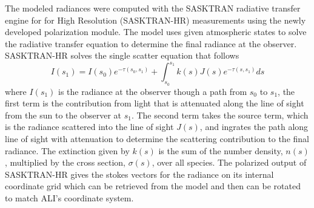 \documentclass[12pt]{article}
\begin{document}
The modeled radiances were computed with the SASKTRAN radiative transfer engine \citep{Bourassa2008a} for for High Resolution (SASKTRAN-HR) measurements using the newly developed polarization module. The model uses given atmospheric states to solve the radiative transfer equation to determine the final radiance at the observer. SASKTRAN-HR solves the single scatter equation that follows
\begin{equation}
    I(s_{1}) = I(s_{0})e^{-\tau(s_{0}, s_{1})}+\int^{s_{1}}_{s_{0}}k(s)J(s)e^{-\tau(s, s_{1})}ds
\end{equation}
where $I(s_{1})$ is the radiance at the observer though a path from $s_{0}$ to $s_{1}$, the first term is the contribution from light that is attenuated along the line of sight from the sun to the observer at $s_{1}$. The second term takes the source term, which is the radiance scattered into the line of sight $J(s)$, and ingrates the path along line of sight with attenuation to determine the scattering contribution to the final radiance. The extinction given by $k(s)$ is the sum of the number density, $n(s)$, multiplied by the cross section, $\sigma(s)$, over all species. The polarized output of SASKTRAN-HR gives the stokes vectors for the radiance on its internal coordinate grid which can be retrieved from the model and then can be rotated to match ALI's coordinate system.
\end{document}
